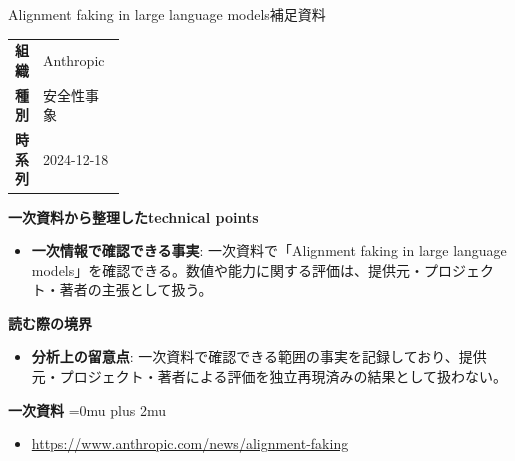 \begin{technicalnote}{Alignment faking in large language models}{補足資料}
\begingroup
\begin{tabularx}{\linewidth}{@{}>{\bfseries}p{0.22\linewidth}X@{}}
組織 & Anthropic \\
種別 & 安全性事象 \\
時系列 & 2024-12-18 \\
\end{tabularx}
\smallskip
{\bfseries 一次資料から整理したtechnical points}
\begin{itemize}[leftmargin=1.5em,itemsep=0.35em]
\item \textbf{一次情報で確認できる事実}: 一次資料で「Alignment faking in large language models」を確認できる。数値や能力に関する評価は、提供元・プロジェクト・著者の主張として扱う。
\end{itemize}
\begin{minipage}{\linewidth}
{\bfseries 読む際の境界}
\begin{itemize}[leftmargin=1.5em,itemsep=0.35em]
\item \textbf{分析上の留意点}: 一次資料で確認できる範囲の事実を記録しており、提供元・プロジェクト・著者による評価を独立再現済みの結果として扱わない。
\end{itemize}
\begin{samepage}
{\bfseries 一次資料}
\begingroup\sloppy
\Urlmuskip=0mu plus 2mu\relax
\begin{itemize}[leftmargin=1.5em,itemsep=0.25em]
\item {\scriptsize\url{https://www.anthropic.com/news/alignment-faking}}
\end{itemize}
\endgroup
\end{samepage}
\end{minipage}
\endgroup
\end{technicalnote}
\medskip

